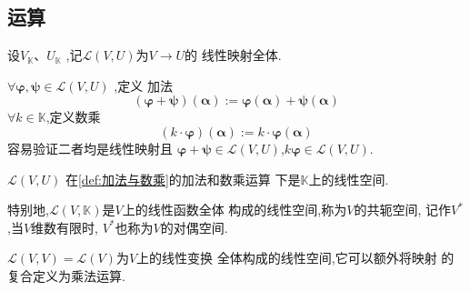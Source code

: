 \subsection{运算}
\begin{formal}
\begin{definition}[线性映射全体]\label{def:线性映射全体}
    设$V_{\mathbb{K}}$、$U_{\mathbb{K}}$
    ,记$\mathcal{L} \left(V,U
    \right)$为$V \longrightarrow U$的
    线性映射全体.
\end{definition}
\end{formal}
\begin{formal}
\begin{definition}[加法与数乘]\label{def:加法与数乘}
    $\forall \bm{\varphi},\bm{\psi}
    \in \mathcal{L} \left(
        V,U
    \right)$
    ,定义
    加法
    \[
    \left(\bm{\varphi}+\bm{\psi}\right)
    \left(\bm{\alpha}\right):=\bm{\varphi}\left(\bm{\alpha}
    \right)+\bm{\psi}\left(\bm{\alpha}
    \right)
    \]
    $\forall k \in \mathbb{K}$,定义数乘
    \[
        \left(
            k\cdot \bm{\varphi}
        \right)\left(\bm{\alpha}
        \right) :=
        k \cdot \bm{\varphi}\left(
            \bm{\alpha}
        \right) 
    \]
    容易验证二者均是线性映射且
    $\bm{\varphi}+\bm{\psi} \in \mathcal{L} 
    \left(V,U\right)$,$k\bm{\varphi} 
    \in \mathcal{L} \left(V,U\right)$.
\end{definition}
\end{formal}
\begin{formal}
\begin{theorem}[映射全体成为线性空间]\label{thm:映射全体成为线性空间}
    $\mathcal{L} \left(V,U\right)$
    在\cref{def:加法与数乘}的加法和数乘运算
    下是$\mathbb{K}$上的线性空间.

    特别地,$\mathcal{L} \left(
        V,\mathbb{K}
    \right)$是$V$上的线性函数全体
    构成的线性空间,称为$V$的共轭空间,
    记作$V^*$,当$V$维数有限时,
    $V^*$也称为$V$的对偶空间.
    
    $\mathcal{L} 
    \left(V,V\right) = \mathcal{L} 
    \left(V\right)$为$V$上的线性变换
    全体构成的线性空间,它可以额外将映射
    的复合定义为乘法运算.
\end{theorem}
\end{formal}
